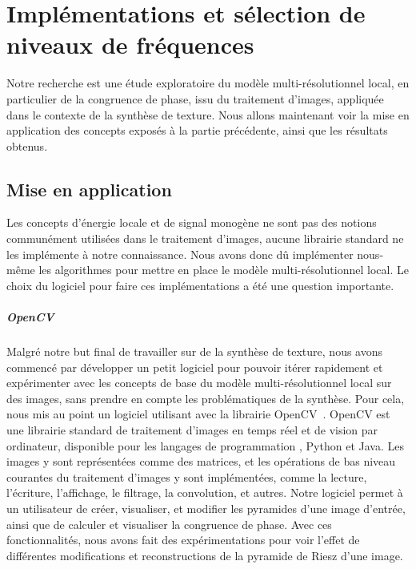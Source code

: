 \chapter{Implémentations et sélection de niveaux de fréquences}
\label{chap:chapitre2}

Notre recherche est une étude exploratoire du modèle multi-résolutionnel local, en particulier de la congruence de phase, issu du traitement d'images, appliquée dans le contexte de la synthèse de texture. Nous allons maintenant voir la mise en application des concepts exposés à la partie précédente, ainsi que les résultats obtenus.

\section{Mise en application}

Les concepts d'énergie locale et de signal monogène ne sont pas des notions communément utilisées dans le traitement d'images, aucune librairie standard ne les implémente à notre connaissance. Nous avons donc dû implémenter nous-même les algorithmes pour mettre en place le modèle multi-résolutionnel local. Le choix du logiciel pour faire ces implémentations a été une question importante.


\paragraph{OpenCV}

Malgré notre but final de travailler sur de la synthèse de texture, nous avons commencé par développer un petit logiciel pour pouvoir itérer rapidement et expérimenter avec les concepts de base du modèle multi-résolutionnel local sur des images, sans prendre en compte les problématiques de la synthèse. Pour cela, nous mis au point un logiciel utilisant \cpp avec la librairie OpenCV~\cite{opencv_library}. OpenCV est une librairie standard de traitement d'images en temps réel et de vision par ordinateur, disponible pour les langages de programmation \cpp, Python et Java. Les images y sont représentées comme des matrices, et les opérations de bas niveau courantes du traitement d'images y sont implémentées, comme la lecture, l'écriture, l'affichage, le filtrage, la convolution, et autres.  Notre logiciel permet à un utilisateur de créer, visualiser, et modifier les pyramides d'une image d'entrée, ainsi que de calculer et visualiser la congruence de phase. Avec ces fonctionnalités, nous avons fait des expérimentations pour voir l'effet de différentes modifications et reconstructions de la pyramide de Riesz d'une image.


